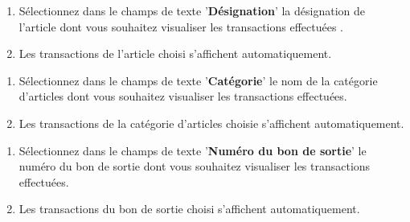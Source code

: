 

\begin{enumerate}[1)]
	\item S\'electionnez dans le champs de texte
	'\textbf{D\'esignation}' la d\'esignation de
	l'article dont vous souhaitez visualiser les
	transactions effectu\'ees .
	
	\item Les transactions de l'article choisi
	s'affichent	automatiquement.
\end{enumerate}



\begin{enumerate}[1)]
	\item S\'electionnez dans le champs de texte
	'\textbf{Cat\'egorie}' le nom de la cat\'egorie
	d'articles dont	vous souhaitez visualiser
	les transactions effectu\'ees. 
	
	\item Les transactions de la cat\'egorie
	d'articles choisie s'affichent automatiquement.
\end{enumerate}



\begin{enumerate}[1)]
	\item S\'electionnez dans le champs de texte
	'\textbf{Num\'ero du bon de sortie}' le num\'ero
	du bon de sortie dont vous souhaitez visualiser
	les transactions effectu\'ees.
	
	\item Les transactions du bon de sortie choisi
	 s'affichent automatiquement.
\end{enumerate}



